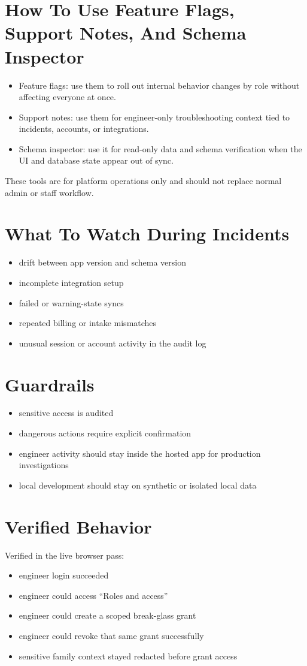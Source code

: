 \documentclass[11pt]{article}
\begin{document}
\section*{How To Use Feature Flags, Support Notes, And Schema Inspector}
\begin{itemize}
  \item Feature flags:
  use them to roll out internal behavior changes by role without affecting everyone at once.
  \item Support notes:
  use them for engineer-only troubleshooting context tied to incidents, accounts, or integrations.
  \item Schema inspector:
  use it for read-only data and schema verification when the UI and database state appear out of sync.
\end{itemize}

These tools are for platform operations only and should not replace normal admin or staff workflow.

\section*{What To Watch During Incidents}
\begin{itemize}
  \item drift between app version and schema version
  \item incomplete integration setup
  \item failed or warning-state syncs
  \item repeated billing or intake mismatches
  \item unusual session or account activity in the audit log
\end{itemize}

\section*{Guardrails}
\begin{itemize}
  \item sensitive access is audited
  \item dangerous actions require explicit confirmation
  \item engineer activity should stay inside the hosted app for production investigations
  \item local development should stay on synthetic or isolated local data
\end{itemize}

\section*{Verified Behavior}
Verified in the live browser pass:
\begin{itemize}
  \item engineer login succeeded
  \item engineer could access ``Roles and access''
  \item engineer could create a scoped break-glass grant
  \item engineer could revoke that same grant successfully
  \item sensitive family context stayed redacted before grant access
\end{itemize}
\end{document}
